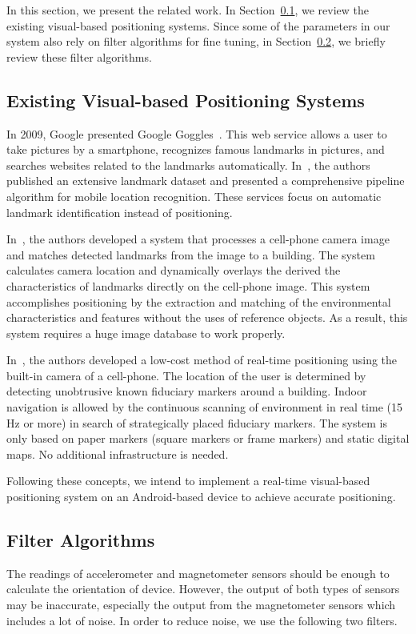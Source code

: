 In this section, we present the related work. In Section~\ref{existing-vps}, we review the existing visual-based positioning systems. Since some of the parameters in our system also rely on filter algorithms for fine tuning, in Section~\ref{filter-algorithms}, we briefly review these filter algorithms.

\subsection{Existing Visual-based Positioning Systems}
\label{existing-vps}

In 2009, Google presented Google Goggles~\cite{bilton2012behind}. This web service allows a user to take pictures by a smartphone, recognizes famous landmarks in pictures, and searches websites related to the landmarks automatically. In~\cite{chen2011city}, the authors published an extensive landmark dataset and presented a comprehensive pipeline algorithm for mobile location recognition. These services focus on automatic landmark identification instead of positioning.

In~\cite{hile2008positioning}, the authors developed a system that processes a cell-phone camera image and matches detected landmarks from the image to a building. The system calculates camera location and dynamically overlays the derived the characteristics of landmarks directly on the cell-phone image. This system accomplishes positioning by the extraction and matching of the environmental characteristics and features without the uses of reference objects. As a result, this system requires a huge image database to work properly.

In~\cite{kawaji2010image, mulloni2009indoor}, the authors developed a low-cost method of real-time positioning using the built-in camera of a cell-phone. The location of the user is determined by detecting unobtrusive known fiduciary markers around a building. Indoor navigation is allowed by the continuous scanning of environment in real time (15 Hz or more) in search of strategically placed fiduciary markers. The system is only based on paper markers (square markers or frame markers) and static digital maps. No additional infrastructure is needed.

Following these concepts, we intend to implement a real-time visual-based positioning system on an Android-based device to achieve accurate positioning.

\subsection{Filter Algorithms}
\label{filter-algorithms}
The readings of accelerometer and magnetometer sensors should be enough to calculate the orientation of device. However, the output of both types of sensors may be inaccurate, especially the output from the magnetometer sensors which includes a lot of noise. In order to reduce noise, we use the following two filters.

